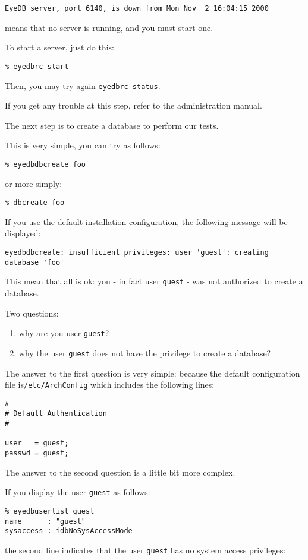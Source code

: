 \verbsize \begin{verbatim}
EyeDB server, port 6140, is down from Mon Nov  2 16:04:15 2000
\end{verbatim}
\normalsize
means that no \eyedb server is running, and you must start one.

To start a server, just do this:
\verbsize \begin{verbatim}
% eyedbrc start
\end{verbatim}
\normalsize

Then, you may try again \texttt{eyedbrc status}.

If you get any trouble at this step, refer to the administration manual.

The next step is to create a database to perform our tests.

This is very simple, you can try as follows:
\verbsize
\begin{verbatim}
% eyedbdbcreate foo
\end{verbatim}
or more simply:
\begin{verbatim}
% dbcreate foo
\end{verbatim}
\normalsize
If you use the default installation configuration, the following message
will be displayed:
\verbsize \begin{verbatim}
eyedbdbcreate: insufficient privileges: user 'guest': creating database 'foo'
\end{verbatim}
\normalsize
This mean that all is ok: you - in fact user \texttt{guest} - was not
authorized to create a database.


Two questions: 
\begin{enumerate}
\item why are you user \texttt{guest}? 
\item why the user \texttt{guest} does not have the privilege to create a database? 
\end{enumerate}

The answer to the first question is very simple: because the default
configuration file is{\EYEDBARCH}\texttt{/etc/ArchConfig}
which includes the following lines:
\verbsize \begin{verbatim}
#
# Default Authentication
#
 
user   = guest;
passwd = guest;
\end{verbatim}
\normalsize
The answer to the second question is a little bit more complex.

If you display the user \texttt{guest} as follows:
\verbsize \begin{verbatim}
% eyedbuserlist guest
name      : "guest"
sysaccess : idbNoSysAccessMode
\end{verbatim}
\normalsize
the second line indicates that the user \texttt{guest} has no system access
privileges:


